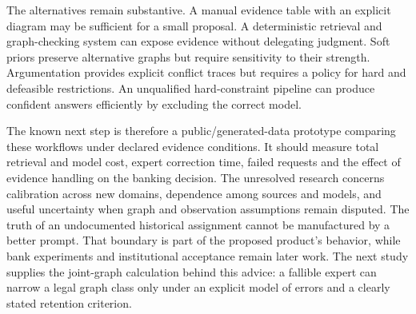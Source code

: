 The alternatives remain substantive. A manual evidence table with an
explicit diagram may be sufficient for a small proposal. A deterministic
retrieval and graph-checking system can expose evidence without
delegating judgment. Soft priors preserve alternative graphs but require
sensitivity to their strength. Argumentation provides explicit conflict
traces but requires a policy for hard and defeasible restrictions. An
unqualified hard-constraint pipeline can produce confident answers
efficiently by excluding the correct model.

The known next step is therefore a public/generated-data prototype
comparing these workflows under declared evidence conditions. It should
measure total retrieval and model cost, expert correction time, failed
requests and the effect of evidence handling on the banking decision.
The unresolved research concerns calibration across new domains,
dependence among sources and models, and useful uncertainty when graph
and observation assumptions remain disputed. The truth of an
undocumented historical assignment cannot be manufactured by a better
prompt. That boundary is part of the proposed product's behavior, while
bank experiments and institutional acceptance remain later work.
The next study supplies the joint-graph calculation behind this advice: a
fallible expert can narrow a legal graph class only under an explicit model
of errors and a clearly stated retention criterion.

\label{exec14:expert-evidence-end}
